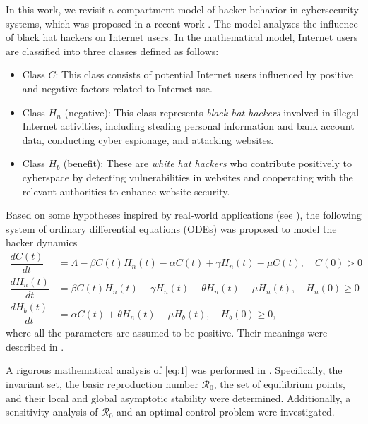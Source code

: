 \documentclass[11pt]{article}
\theoremstyle{definition}
\theoremstyle{remark}
\numberwithin{equation}{section}
\begin{document}
In this work, we revisit a compartment model of hacker behavior in cybersecurity systems, which was proposed in a recent work \cite{Hassouni}.
The model analyzes the influence of black hat hackers on Internet users.
In the mathematical model, Internet users are classified into three classes defined as follows:
\begin{itemize}
\item Class $C$: This class consists of potential Internet users influenced by positive and negative factors related to Internet use.
\item Class $H_n$ (negative): This class represents \textit{black hat hackers} involved in illegal Internet activities, including stealing personal information and bank account data, conducting cyber espionage, and attacking websites.
\item Class $H_b$ (benefit): These are \textit{white hat hackers} who contribute positively to cyberspace by detecting vulnerabilities in websites and cooperating with the relevant authorities to enhance website security.
\end{itemize}
Based on some hypotheses inspired by real-world applications (see \cite[Fig.~1]{Hassouni}), 
the following system of ordinary differential equations (ODEs) was proposed to model the hacker dynamics
\begin{equation}\label{eq:1}
\begin{split}
 \dfrac{d C(t)}{d t} &= \Lambda-\beta C(t) H_n(t)-\alpha C(t)+\gamma H_n(t)-\mu C(t), \quad C(0) > 0 \\
 \dfrac{d H_n(t)}{d t} &= \beta C(t) H_n(t)-\gamma H_n(t)-\theta H_n(t)-\mu H_n(t),\quad H_n(0) \ge 0\\
 \dfrac{d H_b(t)}{d t} &= \alpha C(t)+\theta H_n(t)-\mu H_b(t), \quad H_b(0) \ge 0,
\end{split}
\end{equation}
where all the parameters are assumed to be positive. Their meanings were described in \cite[Table~1]{Hassouni}.

A rigorous mathematical analysis of \eqref{eq:1} was performed in \cite{Hassouni}. 
Specifically, the invariant set, the basic reproduction number $\mathcal{R}_0$, the set of equilibrium points, and their local and global asymptotic stability were determined. 
Additionally, a sensitivity analysis of $\mathcal{R}_0$ and an optimal control problem were investigated.
\end{document}
